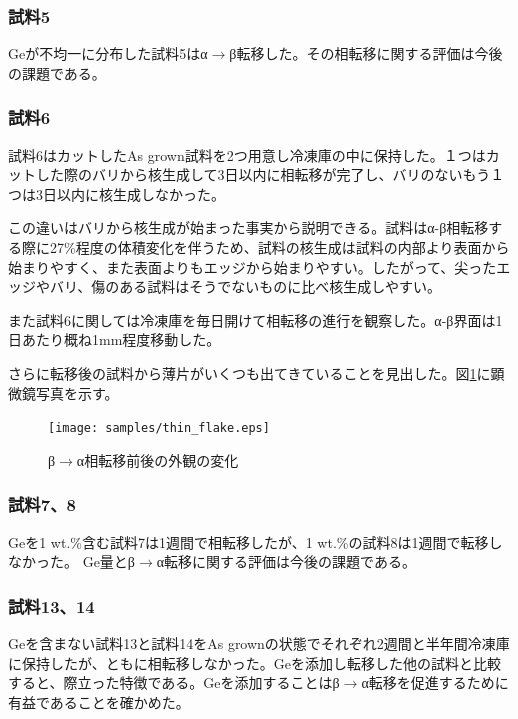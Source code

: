 \subsubsection{試料5}
Geが不均一に分布した試料5はα$\to$β転移した。その相転移に関する評価は今後の課題である。

\subsubsection{試料6}
試料6はカットしたAs grown試料を2つ用意し冷凍庫の中に保持した。１つはカットした際のバリから核生成して3日以内に相転移が完了し、バリのないもう１つは3日以内に核生成しなかった。

この違いはバリから核生成が始まった事実から説明できる。試料はα-β相転移する際に27\%程度の体積変化を伴うため、試料の核生成は試料の内部より表面から始まりやすく、また表面よりもエッジから始まりやすい\cite{Cornelius}。したがって、尖ったエッジやバリ、傷のある試料はそうでないものに比べ核生成しやすい。

また試料6に関しては冷凍庫を毎日開けて相転移の進行を観察した。α-β界面は1日あたり概ね1mm程度移動した。

さらに転移後の試料から薄片がいくつも出てきていることを見出した。図\ref{fig:thin_flake}に顕微鏡写真を示す。
\begin{figure}[!h]
    \begin{center}
   \texttt{[image: samples/thin\_flake.eps]}
  \end{center}
  \caption{β$\to$α相転移前後の外観の変化}
  \label{fig:thin_flake}
\end{figure}

\subsubsection{試料7、8}
Geを1 wt.\%含む試料7は1週間で相転移したが、1 wt.\%の試料8は1週間で転移しなかった。
Ge量とβ$\to$α転移に関する評価は今後の課題である。

\subsubsection{試料13、14}
Geを含まない試料13と試料14をAs grownの状態でそれぞれ2週間と半年間冷凍庫に保持したが、ともに相転移しなかった。Geを添加し転移した他の試料と比較すると、際立った特徴である。Geを添加することはβ$\to$α転移を促進するために有益であることを確かめた。


